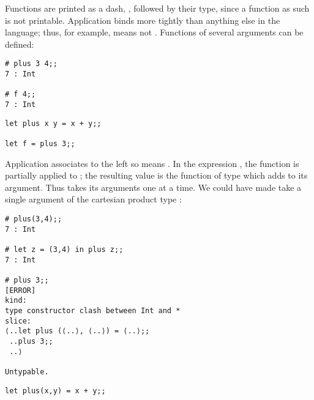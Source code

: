 \documentclass[11pt]{article}
\begin{document}
Functions are printed as a dash, \TTD{-}, followed by their type, since a function as such is not printable.
Application   binds more tightly than
anything else in the language; thus, for example,  means
 not . Functions of several arguments can be
defined:

\begin{session}
\emlsession
\begin{verbatim}
# plus 3 4;;
7 : Int

# f 4;;
7 : Int
\end{verbatim}
\emlfile
\begin{verbatim}
let plus x y = x + y;;

let f = plus 3;;
\end{verbatim}
\emlend
\end{session}


Application associates to the left so  means
.  In the expression , the function  is
partially applied to ; the resulting value is the function of type
 which adds  to its argument.  Thus  takes its
arguments one at a time. We could have made  take a single argument of
the cartesian product type :

\begin{session}
\emlsession
\begin{verbatim}
# plus(3,4);;
7 : Int

# let z = (3,4) in plus z;;
7 : Int

# plus 3;;
[ERROR]
kind:
type constructor clash between Int and *
slice:
⟨..let plus (⟨..⟩, ⟨..⟩) = ⟨..⟩;;
 ..plus 3;;
 ..⟩

Untypable.
\end{verbatim}
\emlfile
\begin{verbatim}
let plus(x,y) = x + y;;
\end{verbatim}
\emlend
\end{session}
\end{document}
